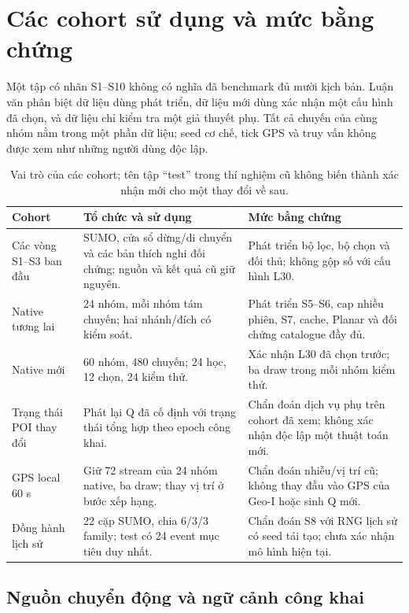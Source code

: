 \section{Các cohort sử dụng và mức bằng chứng}
\label{sec:current-dataset}

Một tập có nhãn S1--S10 không có nghĩa đã benchmark đủ mười kịch bản. Luận văn phân biệt dữ liệu dùng phát triển, dữ liệu mới dùng xác nhận một cấu hình đã chọn, và dữ liệu chỉ kiểm tra một giả thuyết phụ. Tất cả chuyến của cùng nhóm nằm trong một phần dữ liệu; seed cơ chế, tick GPS và truy vấn không được xem như những người dùng độc lập.

\begin{table}[htbp]
\centering\small
\caption{Vai trò của các cohort; tên tập ``test'' trong thí nghiệm cũ không biến thành xác nhận mới cho một thay đổi về sau.}
\label{tab:current-cohorts}
\begin{tabularx}{\textwidth}{P{3.1cm}Y Y}
\toprule
Cohort & Tổ chức và sử dụng & Mức bằng chứng\\
\midrule
Các vòng S1--S3 ban đầu & SUMO, cửa sổ dừng/di chuyển và các bản thích nghi đối chứng; nguồn và kết quả cũ giữ nguyên. & Phát triển bộ lọc, bộ chọn và đối thủ; không gộp số với cấu hình L30.\\
\addlinespace
Native tương lai & 24 nhóm, mỗi nhóm tám chuyến; hai nhánh/đích có kiểm soát. & Phát triển S5--S6, cap nhiều phiên, S7, cache, Planar và đối chứng catalogue đầy đủ.\\
\addlinespace
Native mới & 60 nhóm, 480 chuyến; 24 học, 12 chọn, 24 kiểm thử. & Xác nhận L30 đã chọn trước; ba draw trong mỗi nhóm kiểm thử.\\
\addlinespace
Trạng thái POI thay đổi & Phát lại Q đã cố định với trạng thái tổng hợp theo epoch công khai. & Chẩn đoán dịch vụ phụ trên cohort đã xem; không xác nhận độc lập một thuật toán mới.\\
\addlinespace
GPS local 60 s & Giữ 72 stream của 24 nhóm native, ba draw; thay vị trí ở bước xếp hạng. & Chẩn đoán nhiễu/vị trí cũ; không thay đầu vào GPS của Geo-I hoặc sinh Q mới.\\
\addlinespace
Đồng hành lịch sử & 22 cặp SUMO, chia 6/3/3 family; test có 24 event mục tiêu duy nhất. & Chẩn đoán S8 với RNG lịch sử có seed tái tạo; chưa xác nhận mô hình hiện tại.\\
\bottomrule
\end{tabularx}
\end{table}

\subsection{Nguồn chuyển động và ngữ cảnh công khai}

